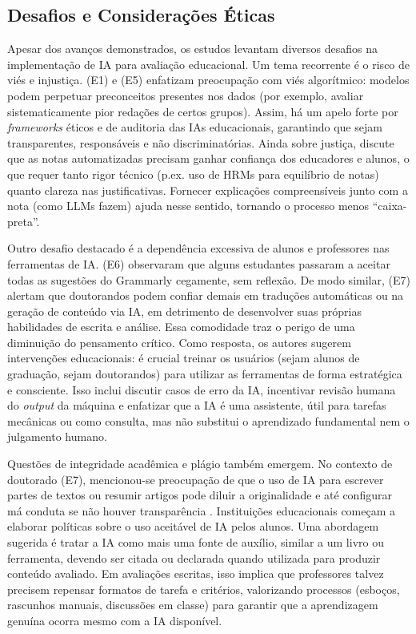 \subsection{Desafios e Considerações Éticas}
\label{subsec:desafios-etica}
Apesar dos avanços demonstrados, os estudos levantam diversos desafios na implementação de IA para avaliação educacional. Um tema recorrente é o risco de viés e injustiça.  (E1) e  (E5) enfatizam preocupação com viés algorítmico: modelos podem perpetuar preconceitos presentes nos dados (por exemplo, avaliar sistematicamente pior redações de certos grupos). Assim, há um apelo forte por \textit{frameworks} éticos e de auditoria das IAs educacionais, garantindo que sejam transparentes, responsáveis e não discriminatórias. Ainda sobre justiça,  discute que as notas automatizadas precisam ganhar confiança dos educadores e alunos, o que requer tanto rigor técnico (p.ex. uso de HRMs para equilíbrio de notas) quanto clareza nas justificativas. Fornecer explicações compreensíveis junto com a nota (como LLMs fazem) ajuda nesse sentido, tornando o processo menos “caixa-preta”.

Outro desafio destacado é a dependência excessiva de alunos e professores nas ferramentas de IA.  (E6) observaram que alguns estudantes passaram a aceitar todas as sugestões do Grammarly cegamente, sem reflexão. De modo similar,  (E7) alertam que doutorandos podem confiar demais em traduções automáticas ou na geração de conteúdo via IA, em detrimento de desenvolver suas próprias habilidades de escrita e análise. Essa comodidade traz o perigo de uma diminuição do pensamento crítico. Como resposta, os autores sugerem intervenções educacionais: é crucial treinar os usuários (sejam alunos de graduação, sejam doutorandos) para utilizar as ferramentas de forma estratégica e consciente. Isso inclui discutir casos de erro da IA, incentivar revisão humana do \textit{output} da máquina e enfatizar que a IA é uma assistente, útil para tarefas mecânicas ou como consulta,  mas não substitui o aprendizado fundamental nem o julgamento humano.

Questões de integridade acadêmica e plágio também emergem. No contexto de doutorado (E7), mencionou-se preocupação de que o uso de IA para escrever partes de textos ou resumir artigos pode diluir a originalidade e até configurar má conduta se não houver transparência \cite{kitzie_ai-empowered_2024}. Instituições educacionais começam a elaborar políticas sobre o uso aceitável de IA pelos alunos. Uma abordagem sugerida é tratar a IA como mais uma fonte de auxílio, similar a um livro ou ferramenta, devendo ser citada ou declarada quando utilizada para produzir conteúdo avaliado. Em avaliações escritas, isso implica que professores talvez precisem repensar formatos de tarefa e critérios, valorizando processos (esboços, rascunhos manuais, discussões em classe) para garantir que a aprendizagem genuína ocorra mesmo com a IA disponível.

